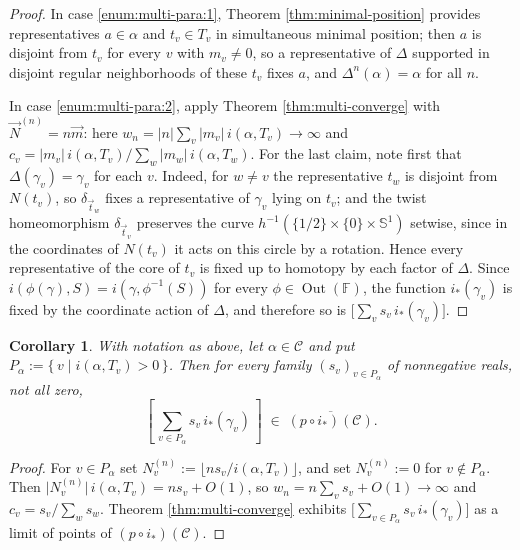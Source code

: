 \documentclass[12pt,a4paper]{amsart}
\numberwithin{equation}{section}
\DeclareMathOperator{\Out}{Out}
\newcommand{\FF}{\mathbb{F}}
\theoremstyle{plain}
\newtheorem{corollary}[theorem]{Corollary}
\theoremstyle{definition}
\theoremstyle{remark}
\begin{document}
\begin{proof}
    In case \eqref{enum:multi-para:1}, Theorem \ref{thm:minimal-position} provides representatives
    $a \in \alpha$ and $t_v \in T_v$ in simultaneous minimal position; then $a$ is
    disjoint from $t_v$ for every $v$ with $m_v \ne 0$, so a representative of
    $\Delta$ supported in disjoint regular neighborhoods of these $t_v$ fixes $a$,
    and $\Delta^n(\alpha) = \alpha$ for all $n$.
    
    In case \eqref{enum:multi-para:2}, apply Theorem \ref{thm:multi-converge} with $\vec N^{(n)} = n \vec m$:
    here $w_n = \lvert n \rvert \sum_v \lvert m_v \rvert\, i(\alpha, T_v) \to \infty$ and
    $c_v = \lvert m_v \rvert\, i(\alpha, T_v) \big/ \sum_w \lvert m_w \rvert\, i(\alpha, T_w)$.
    For the last claim, note first that $\Delta(\gamma_v) = \gamma_v$ for each $v$.
    Indeed, for $w \ne v$ the representative $t_w$ is disjoint from $N(t_v)$, so $\delta_{\vec t_w}$ fixes a representative of $\gamma_v$ lying on $t_v$; and the twist homeomorphism $\delta_{\vec t_v}$ preserves the curve $h^{-1}(\{1/2\} \times \{0\} \times \mathbb{S}^1)$ setwise, since in the coordinates of $N(t_v)$ it acts on this circle by a rotation.
    Hence every representative of the core of $t_v$ is fixed up to homotopy by each factor of $\Delta$.
    Since $i(\phi(\gamma), S) = i(\gamma, \phi^{-1}(S))$ for every $\phi \in \Out(\FF)$, the function $i_*(\gamma_v)$ is fixed by the coordinate action of $\Delta$, and therefore so is $\bigl[\sum_v s_v\, i_*(\gamma_v)\bigr]$.
\end{proof}

\begin{corollary}\label{cor:core_simplex}
    With notation as above, let $\alpha \in \mathcal{C}$ and put
    $P_\alpha := \{\, v \mid i(\alpha, T_v) > 0 \,\}$.
    Then for every family $(s_v)_{v \in P_\alpha}$ of nonnegative reals, not all zero,
    \[
        \left[\, \sum_{v \in P_\alpha} s_v \, i_*(\gamma_v) \,\right]
        \;\in\; \overline{(p \circ i_*)(\mathcal{C})} .
    \]
\end{corollary}

\begin{proof}
    For $v \in P_\alpha$ set $N_v^{(n)} := \lfloor n s_v / i(\alpha, T_v) \rfloor$, and
    set $N_v^{(n)} := 0$ for $v \notin P_\alpha$.
    Then $\lvert N_v^{(n)} \rvert\, i(\alpha, T_v) = n s_v + O(1)$, so
    $w_n = n \sum_v s_v + O(1) \to \infty$ and $c_v = s_v \big/ \sum_w s_w$.
    Theorem \ref{thm:multi-converge} exhibits
    $\bigl[\sum_{v \in P_\alpha} s_v\, i_*(\gamma_v)\bigr]$ as a limit of points of
    $(p \circ i_*)(\mathcal{C})$.
\end{proof}
\end{document}
